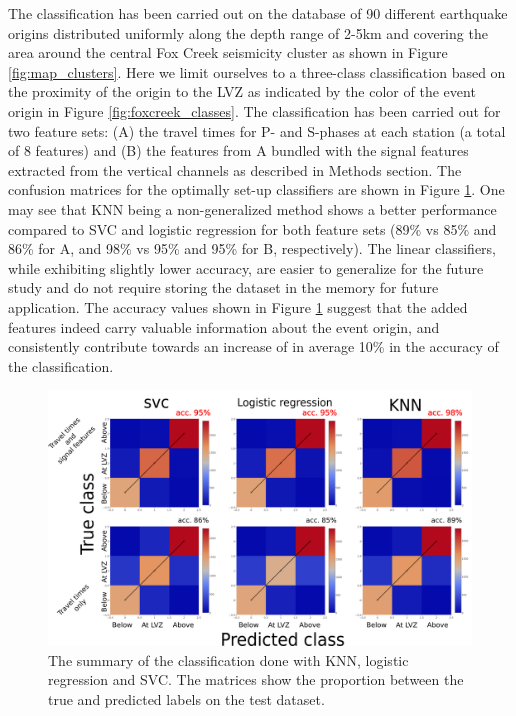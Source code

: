 \documentclass[letterpaper,11pt]{article}
\begin{document}
The classification has been carried out on the database of 90 different earthquake origins distributed uniformly along the depth range of 2-5km and covering the area around the central Fox Creek seismicity cluster as shown in Figure \ref{fig:map_clusters}. Here we limit ourselves to a three-class classification based on the proximity of the origin to the LVZ as indicated by the color of the event origin in Figure \ref{fig:foxcreek_classes}.
The classification has been carried out for two feature sets: (A) the travel times for P- and S-phases at each station (a total of 8 features) and (B) the features from A bundled with the signal features extracted from the vertical channels as described in Methods section. The confusion matrices for the optimally set-up classifiers are shown in Figure \ref{fig:confusion}. One may see that KNN being a non-generalized method shows a better performance compared to SVC and logistic regression for both feature sets (89\% vs 85\% and 86\% for A, and 98\% vs 95\% and 95\% for B, respectively). The linear classifiers, while exhibiting slightly lower accuracy, are easier to generalize for the future study and do not require storing the dataset in the memory for future application.
The accuracy values shown in Figure \ref{fig:confusion} suggest that the added features indeed carry valuable information about the event origin, and consistently contribute towards an increase of in average 10\% in the accuracy of the classification.
\begin{figure}[htb]
\begin{center}
\includegraphics[width=0.55\linewidth,angle=0]{./AntonBiryukov_bibtex/Figure_confusion_horiz.png}
\end{center}
\vspace{-4mm}
\caption{The summary of the classification done with KNN, logistic regression and SVC. The matrices show the proportion between the true and predicted labels on the test dataset.}
\label{fig:confusion}
\end{figure}
\end{document}
